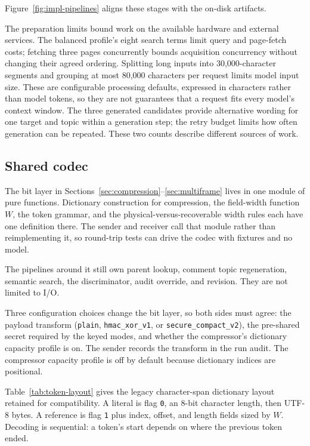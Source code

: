 Figure~\ref{fig:impl-pipelines} aligns these stages with the on-disk artifacts.

The preparation limits bound work on the available hardware and external services. The balanced profile's eight search terms limit query and page-fetch costs; fetching three pages concurrently bounds acquisition concurrency without changing their agreed ordering. Splitting long inputs into 30,000-character segments and grouping at most 80,000 characters per request limits model input size. These are configurable processing defaults, expressed in characters rather than model tokens, so they are not guarantees that a request fits every model's context window. The three generated candidates provide alternative wording for one target and topic within a generation step; the retry budget limits how often generation can be repeated. These two counts describe different sources of work.

\subsection{Shared codec}
The bit layer in Sections~\ref{sec:compression}--\ref{sec:multiframe} lives in one module of pure functions.
Dictionary construction for compression, the field-width function $W$, the token grammar, and the physical-versus-recoverable width rules each have one definition there.
The sender and receiver call that module rather than reimplementing it, so round-trip tests can drive the codec with fixtures and no model.

The pipelines around it still own parent lookup, comment topic regeneration, semantic search, the discriminator, audit override, and revision.
They are not limited to I/O.

Three configuration choices change the bit layer, so both sides must agree: the payload transform (\texttt{plain}, \texttt{hmac\_xor\_v1}, or \texttt{secure\_compact\_v2}), the pre-shared secret required by the keyed modes, and whether the compressor’s dictionary capacity profile is on.
The sender records the transform in the run audit.
The compressor capacity profile is off by default because dictionary indices are positional.

Table~\ref{tab:token-layout} gives the legacy character-span dictionary layout retained for compatibility.
A literal is flag \texttt{0}, an 8-bit character length, then UTF-8 bytes.
A reference is flag \texttt{1} plus index, offset, and length fields sized by $W$.
Decoding is sequential: a token’s start depends on where the previous token ended.

